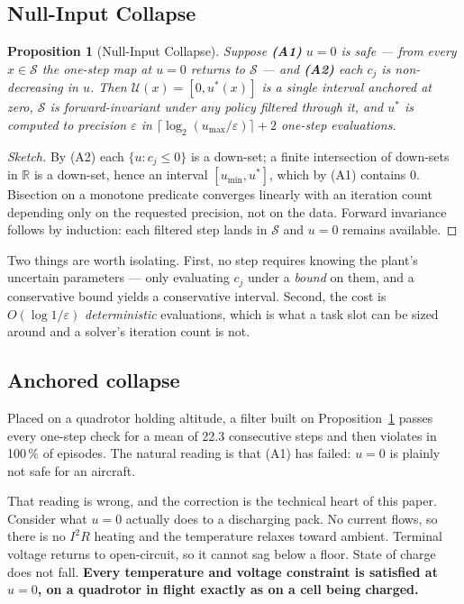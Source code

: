 \documentclass[11pt,letterpaper]{article}
\newtheorem{proposition}{Proposition}
\theoremstyle{definition}
\theoremstyle{remark}
\begin{document}
\subsection{Null-Input Collapse}

\begin{proposition}[Null-Input Collapse]\label{prop:nic}
Suppose \textbf{(A1)} $u = 0$ is safe --- from every $x \in \mathcal{S}$ the one-step map at
$u=0$ returns to $\mathcal{S}$ --- and \textbf{(A2)} each $c_j$ is non-decreasing in $u$. Then
$\mathcal{U}(x) = [0, u^\ast(x)]$ is a single interval anchored at zero, $\mathcal{S}$ is
forward-invariant under any policy filtered through it, and $u^\ast$ is computed to precision
$\varepsilon$ in $\lceil \log_2 (u_{\max}/\varepsilon)\rceil + 2$ one-step evaluations.
\end{proposition}

\begin{proof}[Sketch]
By (A2) each $\{u : c_j \le 0\}$ is a down-set; a finite intersection of down-sets in
$\mathbb{R}$ is a down-set, hence an interval $[u_{\min}, u^\ast]$, which by (A1) contains $0$.
Bisection on a monotone predicate converges linearly with an iteration count depending only on
the requested precision, not on the data. Forward invariance follows by induction: each filtered
step lands in $\mathcal{S}$ and $u=0$ remains available.
\end{proof}

Two things are worth isolating. First, no step requires knowing the plant's uncertain
parameters --- only evaluating $c_j$ under a \emph{bound} on them, and a conservative bound
yields a conservative interval. Second, the cost is $O(\log 1/\varepsilon)$ \emph{deterministic}
evaluations, which is what a task slot can be sized around and a solver's iteration count is
not.

\subsection{Anchored collapse}\label{sec:anchored}

Placed on a quadrotor holding altitude, a filter built on Proposition~\ref{prop:nic}
\cite{krishnan2026safe} passes
every one-step check for a mean of 22.3 consecutive steps and then violates in 100\,\% of
episodes. The natural reading is that (A1) has failed: $u=0$ is plainly not safe for an
aircraft.

That reading is wrong, and the correction is the technical heart of this paper. Consider what
$u=0$ actually does to a discharging pack. No current flows, so there is no $I^2R$ heating and
the temperature relaxes toward ambient. Terminal voltage returns to open-circuit, so it cannot
sag below a floor. State of charge does not fall. \textbf{Every temperature and voltage
constraint is satisfied at $u=0$, on a quadrotor in flight exactly as on a cell being charged.}
\end{document}
